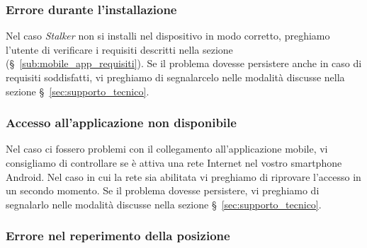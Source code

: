 \documentclass[../manuale-utente.tex]{subfiles}
\begin{document}
\subsubsection{Errore durante l'installazione}%
\label{subs:mobile_app_errore_installazione}

Nel caso \textit{Stalker} non si installi nel dispositivo in modo corretto, preghiamo l'utente di verificare i requisiti descritti nella sezione (§~\ref{sub:mobile_app_requisiti}).
Se il problema dovesse persistere anche in caso di requisiti soddisfatti, vi preghiamo di segnalarcelo nelle modalità discusse nella sezione §~\ref{sec:supporto_tecnico}.

\subsubsection{Accesso all'applicazione non disponibile}%
\label{subs:mobile_app_accesso_non_disponibile}

Nel caso ci fossero problemi con il collegamento all'applicazione mobile, vi consigliamo di controllare se è attiva una rete Internet nel vostro smartphone Android.
Nel caso in cui la rete sia abilitata vi preghiamo di riprovare l’accesso in un secondo momento.
Se il problema dovesse persistere, vi preghiamo di segnalarlo nelle modalità discusse nella sezione §~\ref{sec:supporto_tecnico}.

\subsubsection{Errore nel reperimento della posizione}%
\label{subs:mobile_app_errore_posizione}
\end{document}
